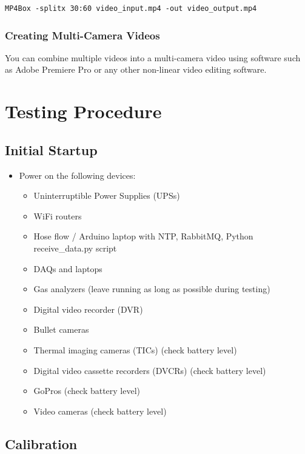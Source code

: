 \documentclass[11pt,oneside]{book}
\begin{document}
\begin{verbatim}
MP4Box -splitx 30:60 video_input.mp4 -out video_output.mp4
\end{verbatim}

\subsection{Creating Multi-Camera Videos}

You can combine multiple videos into a multi-camera video using software such as Adobe Premiere Pro or any other non-linear video editing software.

\appendix

\chapter{Testing Procedure}

\section{Initial Startup}

\begin{itemize}
\item Power on the following devices:
    \begin{itemize}
    \item Uninterruptible Power Supplies (UPSs)
    \item WiFi routers
    \item Hose flow / Arduino laptop with NTP, RabbitMQ, Python receive\_data.py script
    \item DAQs and laptops
    \item Gas analyzers (leave running as long as possible during testing)
    \item Digital video recorder (DVR)
    \item Bullet cameras
    \item Thermal imaging cameras (TICs) (check battery level)
    \item Digital video cassette recorders (DVCRs) (check battery level)
    \item GoPros (check battery level)
    \item Video cameras (check battery level)
    \end{itemize}
\end{itemize}

\section{Calibration}
\end{document}

